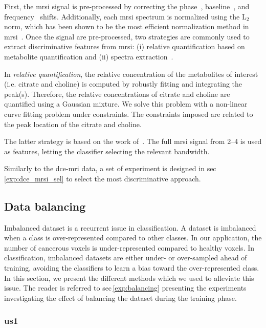 \documentclass[final,3p,times,twocolumn]{elsarticle}
\begin{document}
First, the \ac{mrsi} signal is pre-processed by correcting the
phase~\cite{Chen2002}, baseline~\cite{xi2008baseline}, and
frequency~\cite{Parfait2012} shifts. Additionally, each \ac{mrsi} spectrum is
normalized using the L$_2$ norm, which has been shown to be the most efficient
normalization method in \ac{mrsi}~\cite{Parfait2012}.  Once the signal are
pre-processed, two strategies are commonly used to extract discriminative
features from \ac{mrsi}: (i) relative quantification based on metabolite
quantification and (ii) spectra extraction~\cite{Parfait2012}.

In \emph{relative quantification}, the relative concentration of the
metabolites of interest (i.e. citrate and choline) is computed by robustly
fitting and integrating the peak(s). Therefore, the relative
concentrations of citrate and choline are quantified using a Gaussian
mixture. We solve this problem with a non-linear curve fitting problem under
constraints. The constraints imposed are related to the peak location of the
citrate and choline.

The latter strategy is based on the work of~\cite{Parfait2012}. The full
\ac{mrsi} signal from \SIrange{2}{4}{\ppm} is used as features, letting the
classifier selecting the relevant \si{\ppm} bandwidth.

Similarly to the \ac{dce}-\ac{mri} data, a set of experiment is designed in
\acs{sec}\,\ref{exp:dce_mrsi_sel} to select the most discriminative approach.

\subsection{Data balancing}\label{features:balancing}

Imbalanced dataset is a recurrent issue in classification. A dataset is
imbalanced when a class is over-represented compared to other classes. In our
application, the number of cancerous voxels is under-represented compared to
healthy voxels. In classification, imbalanced datasets are either under- or
over-sampled ahead of training, avoiding the classifiers to learn a bias toward
the over-represented class. In this section, we present the different methods
which we used to alleviate this issue. The reader is referred to
\acs{sec}\,\ref{exp:balancing} presenting the experiments investigating the
effect of balancing the dataset during the training phase.

\subsubsection{\Acl*{us1}}
\end{document}
